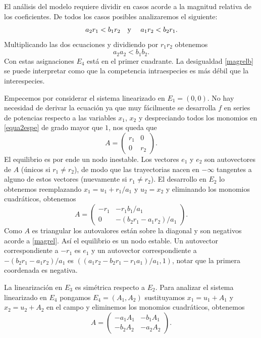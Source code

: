El análisis del modelo requiere dividir en casos acorde a la
magnitud relativa de los coeficientes. De todos los casos posibles
analizaremos el siguiente:
\begin{equation}\label{magrel}
        a_2r_1<b_1r_2\quad\hbox{y }\quad a_1r_2<b_2r_1.
\end{equation}
Multiplicando las dos ecuaciones y dividiendo por $r_1r_2$
obtenemos
\begin{equation}\label{magrelb}
        a_2a_2<b_1b_2.
\end{equation}
Con estas asignaciones $E_4$ está en el primer cuadrante. La
desigualdad \eqref{magrelb} se puede interpretar como que la
competencia intraespecies es más débil que la interespecies.

Empecemos por considerar el sistema linearizado en $E_1=(0,0)$. No
hay necesidad de derivar la ecuación ya que muy fácilmente se
desarrolla $f$ en series de potencias respecto a las variables
$x_1$, $x_2$ y despreciando todos los monomios en
\eqref{equa2espe} de grado mayor que $1$, nos queda que
\[
    A=\begin{pmatrix}
      r_1 & 0 \\
      0 & r_2
    \end{pmatrix}.
\]
El equilibrio es por ende un nodo inestable.  Los vectores $e_1$ y
$e_2$ son autovectores de $A$ (únicos si $r_1\neq r_2$), de modo
que las trayectorias nacen en $-\infty$ tangentes a alguno de
estos vectores (nuevamente si $r_1\neq r_2$). El desarrollo en
$E_2$ lo obtenemos reemplazando $x_1=u_1+r_1/a_1$ y $u_2=x_2$ y
eliminando los monomios cuadráticos, obtenemos
\[
    A=\begin{pmatrix}
      -r_1 & -r_1b_1/a_1 \\
      0 & -(b_2r_1-a_1r_2)/a_1
    \end{pmatrix}.
\]
Como $A$ es triangular los autovalores están sobre la diagonal y
son negativos acorde a \eqref{magrel}. Así el equilibrio es un
nodo estable. Un autovector correspondiente a $-r_1$ es $e_1$ y un
autovector correspondiente a $-(b_2r_1-a_1r_2)/a_1$ es
$((a_1r_2-b_2r_1-r_1a_1)/a_1,1)$, notar que la primera coordenada
es negativa.

La linearización en $E_3$ es simétrica respecto a $E_2$. Para
analizar el sistema linearizado en $E_4$ pongamos $E_4=(A_1,A_2)$
sustituyamos $x_1=u_1+A_1$ y $x_2=u_2+A_2$ en el campo y
eliminemos los monomios cuadráticos, obtenemos
\[
    A=\begin{pmatrix}
      -a_1A_1 & -b_1A_1 \\
      -b_2A_2 & -a_2A_2
    \end{pmatrix}.
\]

